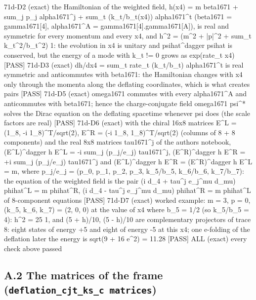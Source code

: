 \documentclass[
  10pt,
]{article}
\newenvironment{Shaded}{}{}
\newcommand{\NormalTok}[1]{#1}
\begin{document}
\begin{Shaded}
\begin{Highlighting}[]
\NormalTok{[PASS] 71d{-}D2  (exact) the Hamiltonian of the weighted field, h(x4) = m beta1671 + sum\_j p\_j alpha1671\^{}j + sum\_t (k\_t/b\_t(x4)) alpha1671\^{}t (beta1671 = gamma1671[4], alpha1671\^{}A = gamma1671[4].gamma1671[A]), is real and symmetric for every momentum and every x4, and h\^{}2 = (m\^{}2 + |p|\^{}2 + sum\_t k\_t\^{}2/b\_t\^{}2) 1: the evolution in x4 is unitary and psihat\^{}dagger psihat is conserved, but the energy of a mode with k\_t != 0 grows as exp(rate\_t x4)}
\NormalTok{[PASS] 71d{-}D3  (exact) dh/dx4 = sum\_t rate\_t (k\_t/b\_t) alpha1671\^{}t is real symmetric and anticommutes with beta1671: the Hamiltonian changes with x4 only through the momenta along the deflating coordinates, which is what creates pairs}
\NormalTok{[PASS] 71d{-}D5  (exact) omega1671 commutes with every alpha1671\^{}A and anticommutes with beta1671; hence the charge{-}conjugate field omega1671 psi\^{}* solves the Dirac equation on the deflating spacetime whenever psi does (the scale factors are real)}
\NormalTok{[PASS] 71d{-}D6  (exact) with the chiral 16x8 matrices E\^{}L = (1\_8, {-}i 1\_8)\^{}T/sqrt(2), E\^{}R = ({-}i 1\_8, 1\_8)\^{}T/sqrt(2) (columns of 8 + 8 components) and the real 8x8 matrices tau1671\^{}j of the author\textquotesingle{}s notebook, (E\^{}L)\^{}dagger h E\^{}L = {-}i sum\_j (p\_j/e\_j) tau1671\^{}j, (E\^{}R)\^{}dagger h E\^{}R = +i sum\_j (p\_j/e\_j) tau1671\^{}j and (E\^{}L)\^{}dagger h E\^{}R = (E\^{}R)\^{}dagger h E\^{}L = m, where p\_j/e\_j = (p\_0, p\_1, p\_2, p\_3, k\_5/b\_5, k\_6/b\_6, k\_7/b\_7): the equation of the weighted field is the pair (i d\_4 + tau\^{}j e\_j\^{}mu d\_mu) phihat\^{}L = m phihat\^{}R, (i d\_4 {-} tau\^{}j e\_j\^{}mu d\_mu) phihat\^{}R = m phihat\^{}L of 8{-}component equations}
\NormalTok{[PASS] 71d{-}D7  (exact) worked example: m = 3, p = 0, (k\_5, k\_6, k\_7) = (2, 0, 0) at the value of x4 where b\_5 = 1/2 (so k\_5/b\_5 = 4): h\^{}2 = 25 1, and (5 + h)/10, (5 {-} h)/10 are complementary projectors of trace 8: eight states of energy +5 and eight of energy {-}5 at this x4; one e{-}folding of the deflation later the energy is sqrt(9 + 16 e\^{}2) = 11.28}
\NormalTok{[PASS] ALL  (exact) every check above passed}
\end{Highlighting}
\end{Shaded}

\hypertarget{a.2-the-matrices-of-the-frame-deflation_cjt_ks_c-matrices}{%
\subsection{\texorpdfstring{A.2 The matrices of the frame
(\texttt{deflation\_cjt\_ks\_c\ matrices})}{A.2 The matrices of the frame (deflation\_cjt\_ks\_c matrices)}}\label{a.2-the-matrices-of-the-frame-deflation_cjt_ks_c-matrices}}
\end{document}

